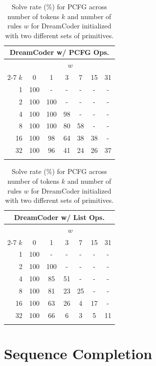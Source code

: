 \documentclass{article}
\begin{document}
\begin{table}
\parbox{.32\linewidth}{
    \small
    \setlength\tabcolsep{3.5pt}
    \centering
    \begin{tabular}{@{}rcccccc@{}}
    \multicolumn{7}{c}{DreamCoder w/ PCFG Ops.} \\
    \toprule
    & \multicolumn{6}{c}{$w$} \\
    \cmidrule(lr){2-7}
    $k$&0&1&3&7&15&31 \\
    \midrule
     1& 100 & - & - & - & - & -       \\
     2& 100 & 100 & - & - & - & -     \\
     4& 100 & 100 & 98 & - & - & -    \\
     8& 100 & 100 & 80 & 58 & - & -   \\
    16& 100 & 98 & 64 & 38 & 38 & -   \\
    32& 100 & 96 & 41 & 24 & 26 & 37  \\
    \bottomrule
    \vspace{-0.5em}
    \end{tabular}
    \vspace{-1.0em}
}
\parbox{.32\linewidth}{
    \small
    \setlength\tabcolsep{3.5pt}
    \centering
    \begin{tabular}{@{}rcccccc@{}}
    \multicolumn{7}{c}{DreamCoder w/ List Ops.} \\
    \toprule
    & \multicolumn{6}{c}{$w$} \\
    \cmidrule(lr){2-7}
    $k$&0&1&3&7&15&31 \\
    \midrule
     1& 100 & - & - & - & - &    -  \\
     2& 100 & 100 & - & - & - &  -  \\
     4& 100 & 85 & 51 & - & - &  -  \\
     8& 100 & 81 & 23 & 25 & - & -  \\
    16& 100 & 63 & 26 & 4 & 17 & -  \\
    32& 100 & 66 & 6 & 3 & 5 & 11  \\
    \bottomrule
    \vspace{-0.5em}
    \end{tabular}
    \vspace{-1.0em}
    \caption{
    \small
    Solve rate (\%) for PCFG across number of tokens $k$ and number of rules $w$ for DreamCoder initialized with two different sets of primitives.}
    \label{tab:pcfg-results-kw-rebuttal}
}
\end{table}
\section{Sequence Completion}
\end{document}
